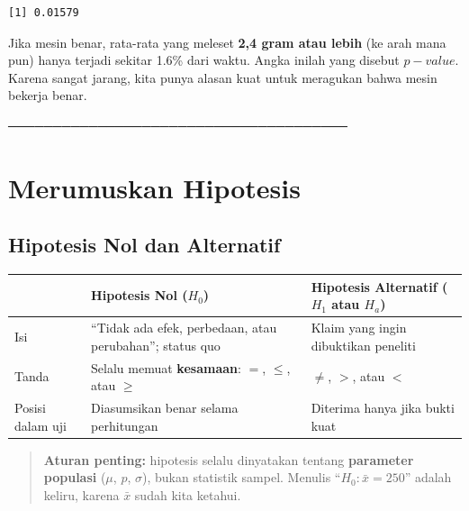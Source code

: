 \documentclass[
  indonesian,
  letterpaper,
]{book}
\newcounter{none} %
\begin{document}
\begin{verbatim}
[1] 0.01579
\end{verbatim}

Jika mesin benar, rata-rata yang meleset \textbf{2,4 gram atau lebih}
(ke arah mana pun) hanya terjadi sekitar 1.6\% dari waktu. Angka inilah
yang disebut \textbf{\(p-value\)}. Karena sangat jarang, kita punya
alasan kuat untuk meragukan bahwa mesin bekerja benar.

──────────────────────────────────────

\section{Merumuskan Hipotesis}\label{merumuskan-hipotesis}

\subsection{Hipotesis Nol dan
Alternatif}\label{hipotesis-nol-dan-alternatif}

{\def\LTcaptype{none} %
\begin{longtable}[]{@{}
  >{\raggedright\arraybackslash}p{}
  >{\raggedright\arraybackslash}p{}
  >{\raggedright\arraybackslash}p{}@{}}
\toprule\noalign{}
\begin{minipage}[b]{\linewidth}\raggedright
\end{minipage} & \begin{minipage}[b]{\linewidth}\raggedright
Hipotesis Nol (\(H_0\))
\end{minipage} & \begin{minipage}[b]{\linewidth}\raggedright
Hipotesis Alternatif (\(H_1\) atau \(H_a\))
\end{minipage} \\
\midrule\noalign{}
\endhead
\bottomrule\noalign{}
\endlastfoot
Isi & ``Tidak ada efek, perbedaan, atau perubahan''; status quo & Klaim
yang ingin dibuktikan peneliti \\
Tanda & Selalu memuat \textbf{kesamaan}: \(=\), \(\le\), atau \(\ge\) &
\(\ne\), \(>\), atau \(<\) \\
Posisi dalam uji & Diasumsikan benar selama perhitungan & Diterima hanya
jika bukti kuat \\
\end{longtable}
}

\begin{quote}
\textbf{Aturan penting:} hipotesis selalu dinyatakan tentang
\textbf{parameter populasi} (\(\mu\), \(p\), \(\sigma\)), bukan
statistik sampel. Menulis ``\(H_0: \bar{x} = 250\)'' adalah keliru,
karena \(\bar{x}\) sudah kita ketahui.
\end{quote}
\end{document}
